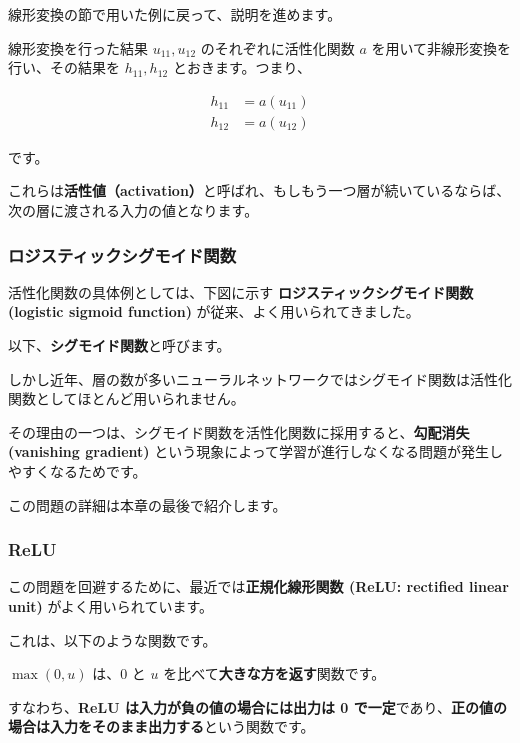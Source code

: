 線形変換の節で用いた例に戻って、説明を進めます。

線形変換を行った結果 $u_{11}, u_{12}$ のそれぞれに活性化関数 $a$ を用いて非線形変換を行い、その結果を $h_{11}, h_{12}$ とおきます。つまり、


\begin{align}
h_{11} &= a(u_{11}) \\
h_{12} &= a(u_{12})
\end{align}


です。

これらは\textbf{活性値（activation）}と呼ばれ、もしもう一つ層が続いているならば、次の層に渡される入力の値となります。




\subsubsection{ロジスティックシグモイド関数}


活性化関数の具体例としては、下図に示す \textbf{ロジスティックシグモイド関数 (logistic sigmoid function)} が従来、よく用いられてきました。




以下、\textbf{シグモイド関数}と呼びます。


しかし近年、層の数が多いニューラルネットワークではシグモイド関数は活性化関数としてほとんど用いられません。

その理由の一つは、シグモイド関数を活性化関数に採用すると、\textbf{勾配消失 (vanishing gradient)} という現象によって学習が進行しなくなる問題が発生しやすくなるためです。

この問題の詳細は本章の最後で紹介します。


\subsubsection{ReLU}


この問題を回避するために、最近では\textbf{正規化線形関数 (ReLU: rectified linear unit)} がよく用いられています。

これは、以下のような関数です。




$\max(0, u)$ は、$0$ と $u$ を比べて\textbf{大きな方を返す}関数です。

すなわち、\textbf{ReLU は入力が負の値の場合には出力は 0 で一定}であり、\textbf{正の値の場合は入力をそのまま出力する}という関数です。

